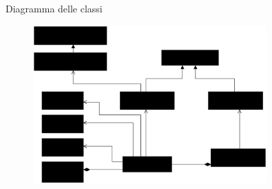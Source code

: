   \begin{frame}{Diagramma delle classi}
  
    \begin{figure}[h]
      \label{business_model}
      \centering
      \includegraphics[width=0.8\textwidth]{images/modello_business_simplified.eps}
    \end{figure}
   
  \end{frame}


  
  



